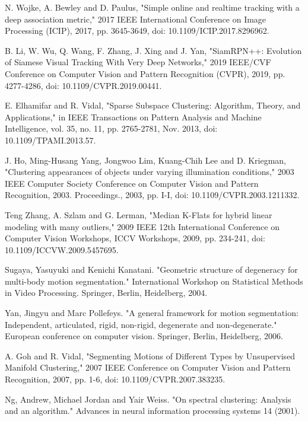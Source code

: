 

\begin{thebibliography}{99}

N. Wojke, A. Bewley and D. Paulus, "Simple online and realtime tracking with a deep association metric," 2017 IEEE International Conference on Image Processing (ICIP), 2017, pp. 3645-3649, doi: 10.1109/ICIP.2017.8296962.

B. Li, W. Wu, Q. Wang, F. Zhang, J. Xing and J. Yan, "SiamRPN++: Evolution of Siamese Visual Tracking With Very Deep Networks," 2019 IEEE/CVF Conference on Computer Vision and Pattern Recognition (CVPR), 2019, pp. 4277-4286, doi: 10.1109/CVPR.2019.00441.

E. Elhamifar and R. Vidal, "Sparse Subspace Clustering: Algorithm, Theory, and Applications," in IEEE Transactions on Pattern Analysis and Machine Intelligence, vol. 35, no. 11, pp. 2765-2781, Nov. 2013, doi: 10.1109/TPAMI.2013.57.

J. Ho, Ming-Husang Yang, Jongwoo Lim, Kuang-Chih Lee and D. Kriegman, "Clustering appearances of objects under varying illumination conditions," 2003 IEEE Computer Society Conference on Computer Vision and Pattern Recognition, 2003. Proceedings., 2003, pp. I-I, doi: 10.1109/CVPR.2003.1211332.

Teng Zhang, A. Szlam and G. Lerman, "Median K-Flats for hybrid linear modeling with many outliers," 2009 IEEE 12th International Conference on Computer Vision Workshops, ICCV Workshops, 2009, pp. 234-241, doi: 10.1109/ICCVW.2009.5457695.

Sugaya, Yasuyuki and Kenichi Kanatani. "Geometric structure of degeneracy for multi-body motion segmentation." International Workshop on Statistical Methods in Video Processing. Springer, Berlin, Heidelberg, 2004.

Yan, Jingyu and Marc Pollefeys. "A general framework for motion segmentation: Independent, articulated, rigid, non-rigid, degenerate and non-degenerate." European conference on computer vision. Springer, Berlin, Heidelberg, 2006.

A. Goh and R. Vidal, "Segmenting Motions of Different Types by Unsupervised Manifold Clustering," 2007 IEEE Conference on Computer Vision and Pattern Recognition, 2007, pp. 1-6, doi: 10.1109/CVPR.2007.383235.

Ng, Andrew, Michael Jordan and Yair Weiss. "On spectral clustering: Analysis and an algorithm." Advances in neural information processing systems 14 (2001).

\end{thebibliography}


